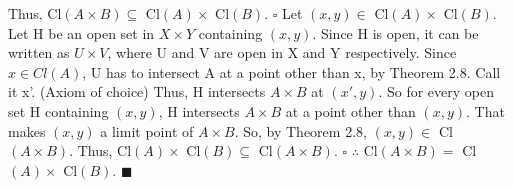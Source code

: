 \documentclass[12pt]{article}
\begin{document}
  \newline
  Thus, Cl\((A \times B) \subseteq\) Cl\((A) \times\) Cl\((B)\).
  \newline \(\square\) \newline
  Let \((x,y) \in\) Cl\((A) \times\) Cl\((B)\).
  \newline
  Let H be an open set in \(X \times Y\) containing \((x,y)\).
  \newline
  Since H is open, it can be written as \(U \times V\), where U and V are open in X and Y respectively.
  \newline
  Since \(x \in Cl(A)\), U has to intersect A at a point other than x, by Theorem 2.8. Call it x'. (Axiom of choice)
  \newline
  \newline
  Thus, H intersects \(A \times B\) at \((x',y)\).
  \newline
  So for every open set H containing \((x,y)\), H intersects \(A \times B\) at a point other than \((x,y)\).
  \newline
  That makes \((x,y)\) a limit point of \(A \times B\).
  \newline
  So, by Theorem 2.8, \((x,y) \in\) Cl\((A \times B)\).
  \newline
  Thus, Cl\((A) \times\) Cl\((B) \subseteq\) Cl\((A \times B)\).
  \newline \(\square\) \newline
  \(\therefore\) Cl\((A \times B) =\) Cl\((A) \times\) Cl\((B)\).
  \newline \(\blacksquare\)
\end{document}
